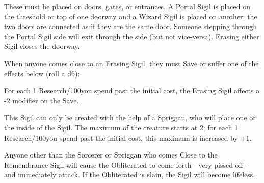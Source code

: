 {

These must be placed on doors, gates, or entrances.  A Portal Sigil is placed on the threshold or top of one doorway and a Wizard Sigil is placed on another; the two doors are connected as if they are the same door.  Someone stepping through the Portal Sigil side will exit through the  side (but not vice-versa).  Erasing either Sigil closes the doorway.

\large{}\normalsize






When anyone comes close to an Erasing Sigil, they must Save or suffer one of the effects below (roll a d6):


For each 1 Research/100\AU you spend past the initial cost, the Erasing Sigil affects a -2 modifier on the Save.

\cbreak


This Sigil can only be created with the help of a Spriggan, who will place one of the  inside of the Sigil.  The maximum \HD of the creature starts at 2; for each 1 Research/100\AU you spend past the initial cost, this maximum is increased by +1.

Anyone other than the Sorcerer or Spriggan who comes Close to the Remembrance Sigil will cause the Obliterated to come forth - very pissed off - and immediately attack.  If the Obliterated is slain, the Sigil will become lifeless.



}

